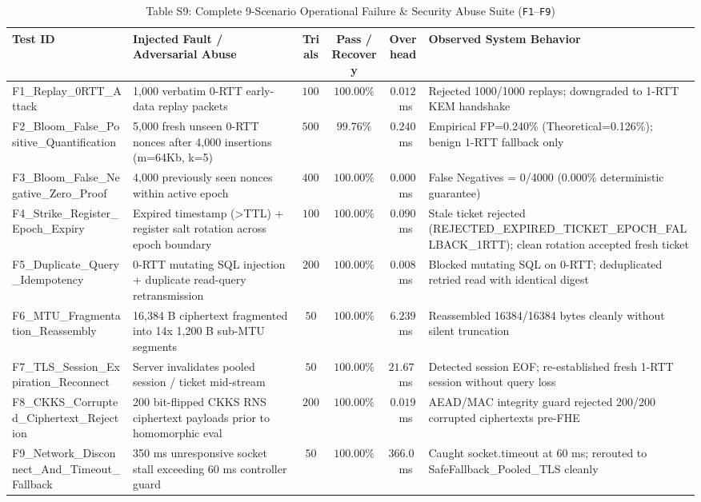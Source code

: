 \documentclass[10pt,journal,compsoc]{IEEEtran}
\begin{document}
\begin{table}[!t]
\centering
\caption{Table S9: Complete 9-Scenario Operational Failure \& Security Abuse Suite (\texttt{F1}--\texttt{F9})}
\setlength{\tabcolsep}{3.4pt}
\renewcommand{\arraystretch}{1.04}
\begin{adjustbox}{max width=\textwidth}
\begin{tabular}{@{}llcccl@{}}
\toprule
\textbf{Test ID} & \textbf{Injected Fault / Adversarial Abuse} & \textbf{Trials} & \textbf{Pass / Recovery} & \textbf{Overhead} & \textbf{Observed System Behavior} \\
\midrule
F1\_Replay\_0RTT\_Attack & 1,000 verbatim 0-RTT early-data replay packets & $1000$ & $100.00\%$ & $0.012$~ms & Rejected 1000/1000 replays; downgraded to 1-RTT KEM handshake \\
F2\_Bloom\_False\_Positive\_Quantification & 5,000 fresh unseen 0-RTT nonces after 4,000 insertions (m=64Kb, k=5) & $5000$ & $99.76\%$ & $0.240$~ms & Empirical FP=0.240\% (Theoretical=0.126\%); benign 1-RTT fallback only \\
F3\_Bloom\_False\_Negative\_Zero\_Proof & 4,000 previously seen nonces within active epoch & $4000$ & $100.00\%$ & $0.000$~ms & False Negatives = 0/4000 (0.000\% deterministic guarantee) \\
F4\_Strike\_Register\_Epoch\_Expiry & Expired timestamp (>TTL) + register salt rotation across epoch boundary & $100$ & $100.00\%$ & $0.090$~ms & Stale ticket rejected (REJECTED\_EXPIRED\_TICKET\_EPOCH\_FALLBACK\_1RTT); clean rotation accepted fresh ticket \\
F5\_Duplicate\_Query\_Idempotency & 0-RTT mutating SQL injection + duplicate read-query retransmission & $200$ & $100.00\%$ & $0.008$~ms & Blocked mutating SQL on 0-RTT; deduplicated retried read with identical digest \\
F6\_MTU\_Fragmentation\_Reassembly & 16,384 B ciphertext fragmented into 14x 1,200 B sub-MTU segments & $50$ & $100.00\%$ & $6.239$~ms & Reassembled 16384/16384 bytes cleanly without silent truncation \\
F7\_TLS\_Session\_Expiration\_Reconnect & Server invalidates pooled session / ticket mid-stream & $50$ & $100.00\%$ & $21.675$~ms & Detected session EOF; re-established fresh 1-RTT session without query loss \\
F8\_CKKS\_Corrupted\_Ciphertext\_Rejection & 200 bit-flipped CKKS RNS ciphertext payloads prior to homomorphic eval & $200$ & $100.00\%$ & $0.019$~ms & AEAD/MAC integrity guard rejected 200/200 corrupted ciphertexts pre-FHE \\
F9\_Network\_Disconnect\_And\_Timeout\_Fallback & 350 ms unresponsive socket stall exceeding 60 ms controller guard & $50$ & $100.00\%$ & $366.044$~ms & Caught socket.timeout at 60 ms; rerouted to SafeFallback\_Pooled\_TLS cleanly \\
\bottomrule
\end{tabular}
\end{adjustbox}
\end{table}
\end{document}
